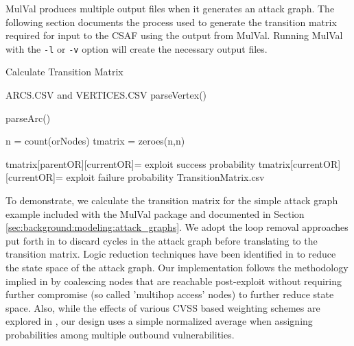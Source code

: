 
MulVal produces multiple output files when it generates an attack graph. The following section documents the process used to generate the transition matrix required for input to the CSAF using the output from MulVal. Running MulVal with the \verb|-l| or \verb|-v| option will create the necessary output files.


\begin{algorithm}[ht]
\caption{Calculate Transition Matrix}
\label{genTransMatrix}

\begin{algorithmic}
\REQUIRE ARCS.CSV and VERTICES.CSV
 \STATE parseVertex() 
\ENDFOR

 \STATE parseArc() 
\ENDFOR

\STATE n = count(orNodes) 
\STATE tmatrix = zeroes(n,n) 

 \STATE tmatrix[parentOR][currentOR]= exploit success probability
 \ENDFOR
 \STATE tmatrix[currentOR][currentOR]= exploit failure probability %
\ENDFOR
 \RETURN TransitionMatrix.csv
\end{algorithmic}
\end{algorithm}


To demonstrate, we calculate the transition matrix for the simple attack graph example included with the MulVal package and documented in Section \ref{sec:background:modeling:attack_graphs}. We adopt the loop removal approaches put forth in \cite{Ou_Boyer_McQueen_2006} to discard cycles in the attack graph before translating to the transition matrix. Logic reduction techniques have been identified in \cite{Hong_Kim_Takaoka_2013} to reduce the state space of the attack graph.  Our implementation follows the methodology implied in \cite{Abraham_2016} by coalescing nodes that are reachable post-exploit without requiring further compromise (so called 'multihop access' nodes) to further reduce state space. Also, while the effects of various CVSS based weighting schemes are explored in \cite{Sembiring_Ramadhan_Gondokaryono_Arman_2015}, our design uses a simple normalized average when assigning probabilities among multiple outbound vulnerabilities.

